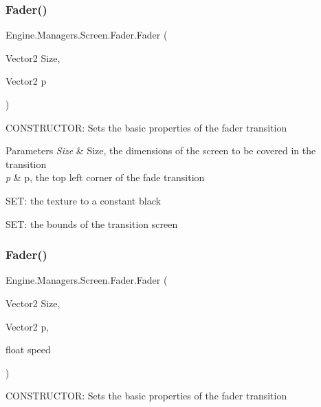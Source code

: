 \subsubsection{\texorpdfstring{Fader()}{Fader()}\hspace{0.1cm}{\footnotesize\ttfamily [2/3]}}
{\footnotesize\ttfamily Engine.\+Managers.\+Screen.\+Fader.\+Fader (\begin{DoxyParamCaption}\item[{Vector2}]{Size,  }\item[{Vector2}]{p }\end{DoxyParamCaption})\hspace{0.3cm}{\ttfamily [inline]}}



C\+O\+N\+S\+T\+R\+U\+C\+T\+OR\+: Sets the basic properties of the fader transition 


\begin{DoxyParams}{Parameters}
{\em Size} & Size, the dimensions of the screen to be covered in the transition\\
\hline
{\em p} & p, the top left corner of the fade transition\\
\hline
\end{DoxyParams}
S\+ET\+: the texture to a constant black

S\+ET\+: the bounds of the transition screen \mbox{\label{a00534_ad75a8b6e54b0557b7b463051858524bc}} 
\subsubsection{\texorpdfstring{Fader()}{Fader()}\hspace{0.1cm}{\footnotesize\ttfamily [3/3]}}
{\footnotesize\ttfamily Engine.\+Managers.\+Screen.\+Fader.\+Fader (\begin{DoxyParamCaption}\item[{Vector2}]{Size,  }\item[{Vector2}]{p,  }\item[{float}]{speed }\end{DoxyParamCaption})\hspace{0.3cm}{\ttfamily [inline]}}



C\+O\+N\+S\+T\+R\+U\+C\+T\+OR\+: Sets the basic properties of the fader transition 


